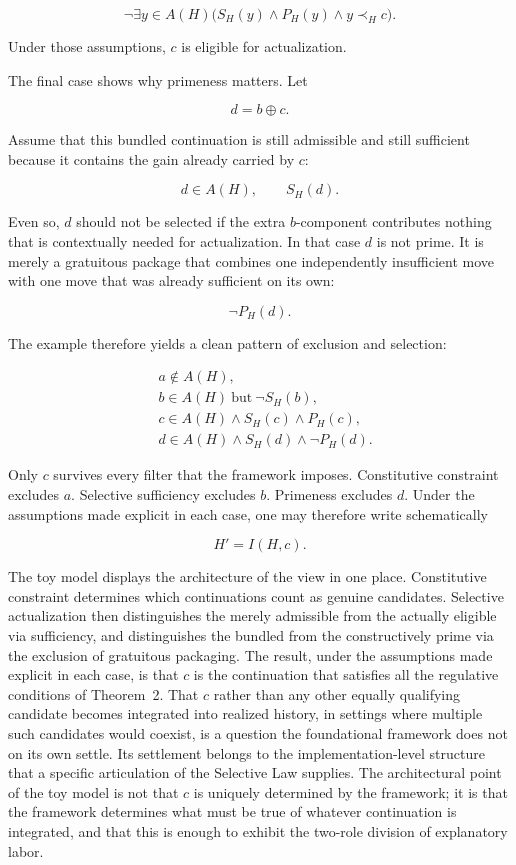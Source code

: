 \documentclass[11pt]{article}
\theoremstyle{foundation}
\begin{document}
\[
\neg \exists y \in A(H)\bigl(S_H(y) \wedge P_H(y) \wedge y \prec_H c\bigr).
\]

Under those assumptions, $c$ is eligible for actualization.

The final case shows why primeness matters. Let

\[
d = b \oplus c.
\]

Assume that this bundled continuation is still admissible and still sufficient because it contains the gain already carried by $c$:

\[
d \in A(H), \qquad S_H(d).
\]

Even so, $d$ should not be selected if the extra $b$-component contributes nothing that is contextually needed for actualization. In that case $d$ is not prime. It is merely a gratuitous package that combines one independently insufficient move with one move that was already sufficient on its own:

\[
\neg P_H(d).
\]

The example therefore yields a clean pattern of exclusion and selection:

\[
\begin{aligned}
&a \notin A(H),\\
&b \in A(H)\ \text{but}\ \neg S_H(b),\\
&c \in A(H) \wedge S_H(c) \wedge P_H(c),\\
&d \in A(H) \wedge S_H(d) \wedge \neg P_H(d).
\end{aligned}
\]

Only $c$ survives every filter that the framework imposes. Constitutive constraint excludes $a$. Selective sufficiency excludes $b$. Primeness excludes $d$. Under the assumptions made explicit in each case, one may therefore write schematically

\[
H' = I(H,c).
\]

The toy model displays the architecture of the view in one place. Constitutive constraint determines which continuations count as genuine candidates. Selective actualization then distinguishes the merely admissible from the actually eligible via sufficiency, and distinguishes the bundled from the constructively prime via the exclusion of gratuitous packaging. The result, under the assumptions made explicit in each case, is that $c$ is the continuation that satisfies all the regulative conditions of Theorem~2. That $c$ rather than any other equally qualifying candidate becomes integrated into realized history, in settings where multiple such candidates would coexist, is a question the foundational framework does not on its own settle. Its settlement belongs to the implementation-level structure that a specific articulation of the Selective Law supplies. The architectural point of the toy model is not that $c$ is uniquely determined by the framework; it is that the framework determines what must be true of whatever continuation is integrated, and that this is enough to exhibit the two-role division of explanatory labor.
\end{document}
